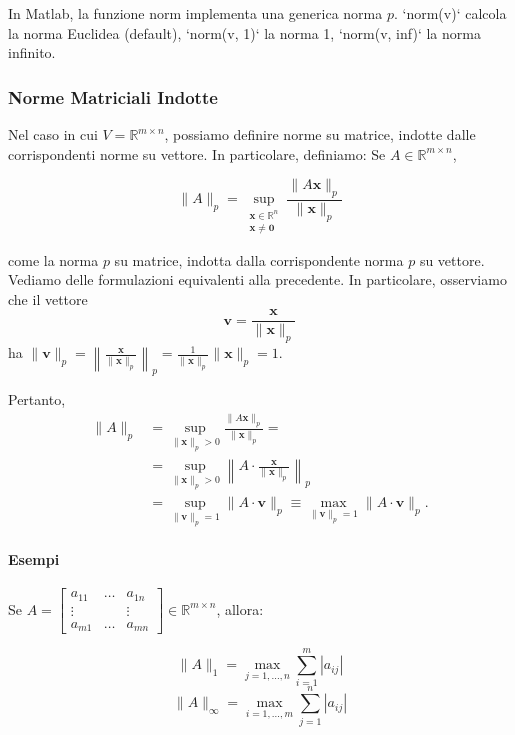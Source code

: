 \begin{osservazione}
In Matlab, la funzione norm implementa una generica norma $p$. `norm(v)` calcola la norma Euclidea (default), `norm(v, 1)` la norma 1, `norm(v, inf)` la norma infinito.
\end{osservazione}

\subsubsection{Norme Matriciali Indotte}
Nel caso in cui $V=\mathbb{R}^{m \times n}$, possiamo definire norme su matrice, indotte dalle corrispondenti norme su vettore. In particolare, definiamo:
Se $A \in \mathbb{R}^{m \times n}$,

$$ \| A \|_p = \sup_{\substack{\mathbf{x} \in \mathbb{R}^n \\ \mathbf{x} \neq \mathbf{0}}} \frac{\| A \mathbf{x} \|_p}{\| \mathbf{x} \|_p} $$

come la norma $p$ su matrice, indotta dalla corrispondente norma $p$ su vettore.
Vediamo delle formulazioni equivalenti alla precedente. In particolare, osserviamo che il vettore
$$ \mathbf{v} = \frac{\mathbf{x}}{\| \mathbf{x} \|_p} $$
ha $\| \mathbf{v} \|_p = \left\| \frac{\mathbf{x}}{\| \mathbf{x} \|_p} \right\|_p = \frac{1}{\| \mathbf{x} \|_p} \| \mathbf{x} \|_p = 1$.

Pertanto,
\begin{align*}
    \| A \|_p &= \sup_{\| \mathbf{x} \|_p > 0} \frac{\| A \mathbf{x} \|_p}{\| \mathbf{x} \|_p} = \\
              &= \sup_{\| \mathbf{x} \|_p > 0} \left\| A \cdot \frac{\mathbf{x}}{\| \mathbf{x} \|_p} \right\|_p \\
              &= \sup_{\| \mathbf{v} \|_p = 1} \| A \cdot \mathbf{v} \|_p \equiv \max_{\| \mathbf{v} \|_p = 1} \| A \cdot \mathbf{v} \|_p.
\end{align*}

\paragraph{Esempi}
Se $A = \begin{bmatrix} a_{11} & \dots & a_{1n} \\ \vdots & & \vdots \\ a_{m1} & \dots & a_{mn} \end{bmatrix} \in \mathbb{R}^{m \times n}$, allora:

$$ \| A \|_1 = \max_{j=1,\dots,n} \sum_{i=1}^m |a_{ij}| $$
$$ \| A \|_\infty = \max_{i=1,\dots,m} \sum_{j=1}^n |a_{ij}| $$

